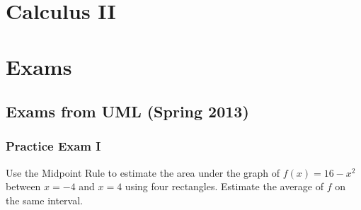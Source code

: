 \documentclass[crop=false,class=article,oneside]{standalone}
\begin{document}
    \ifx\ifmathcoursescalculusII\undefined
        \section*{Calculus II}
        \setcounter{section}{2}
    \else
        \section{Exams}
    \fi
    \subsection{Exams from UML (Spring 2013)}
        \subsubsection{Practice Exam I}
        \begin{problem}
        Use the Midpoint Rule to estimate the area under the
        graph of $f(x)=16-x^{2}$ between $x=-4$ and $x=4$ using
        four rectangles. Estimate the average of $f$
        on the same interval.
        \end{problem}
\end{document}

